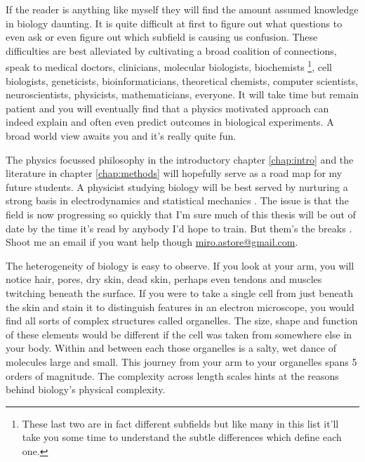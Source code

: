 If the reader is anything like myself they will find the amount assumed knowledge in biology daunting. It is quite difficult at first to figure out what questions to even ask or even figure out which subfield is causing us confusion. These difficulties are best alleviated by cultivating a broad coalition of connections, speak to medical doctors, clinicians, molecular biologists, biochemists \footnote{These last two are in fact different subfields but like many in this list it'll take you some time to understand the subtle differences which define each one.}, cell biologists, geneticists, bioinformaticians, theoretical chemists, computer scientists, neuroscientists, physicists, mathematicians, everyone. It will take time but remain patient and you will eventually find that a physics motivated approach can indeed explain and often even predict outcomes in biological experiments. A broad world view awaits you and it's really quite fun. 

The physics focussed philosophy in the introductory chapter \ref{chap:intro} and the literature in chapter \ref{chap:methods} will hopefully serve as a road map for my future students. A physicist studying biology will be best served by nurturing a strong basis in electrodynamics and statistical mechanics \cite{griffiths2017, reif2009, zuckerman2010}. The issue is that the field is now progressing so quickly that I'm sure much of this thesis will be out of date by the time it's read by anybody I'd hope to train. But them's the breaks \cite{reuters2022}. Shoot me an email if you want help though \href{mailto:miro.astore@gmailcom}{miro.astore@gmail.com}.

The heterogeneity of biology is easy to observe. If you look at your arm, you will notice hair, pores, dry skin, dead skin, perhaps even tendons and muscles twitching beneath the surface. If you were to take a single cell from just beneath the skin and stain it to distinguish features in an electron microscope, you would find all sorts of complex structures called organelles. The size, shape and function of these elements would be different if the cell was taken from somewhere else in your body. Within and between each those organelles is a salty, wet dance of molecules large and small. This journey from your arm to your organelles spans 5 orders of magnitude. The complexity across length scales hints at the reasons behind biology's physical complexity. 


